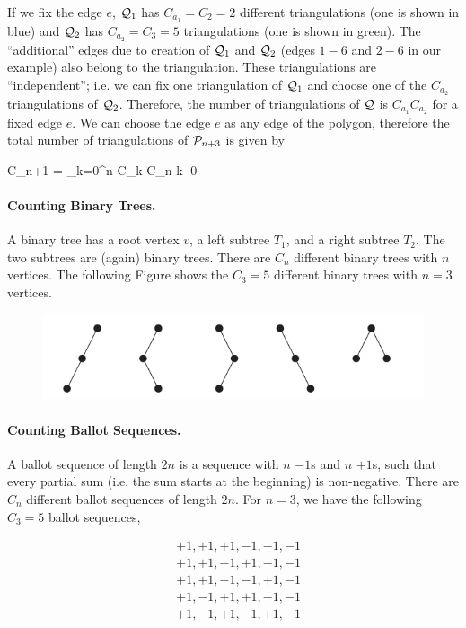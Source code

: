 If we fix the edge $e$, $\mathcal{Q}_1$ has $C_{a_1}= C_2=2$ different triangulations (one is shown in blue) and $\mathcal{Q}_2$ has $C_{a_2}= C_3 = 5$ triangulations (one is shown in green). The ``additional'' edges due to creation of $\mathcal{Q}_1$ and $\mathcal{Q}_2$ (edges $1-6$ and $2-6$ in our example) also belong to the triangulation. These triangulations are ``independent''; i.e. we can fix one triangulation of $\mathcal{Q}_1$ and choose one of the $C_{a_2}$ triangulations of $\mathcal{Q}_2$. Therefore, the number of triangulations of $\mathcal{Q}$ is $C_{a_1} C_{a_2}$ for a fixed edge $e$. We can choose the edge $e$ as any edge of the polygon, therefore the total number of triangulations of $\mathcal{P}_{n+3}$ is given by

\bee
C_{n+1} = \sum_{k=0}^n C_k C_{n-k} \qed
\eee

\paragraph{Counting Binary Trees.} A binary tree has a root vertex $v$, a left subtree $T_1$, and a right subtree $T_2$. The two subtrees are (again) binary trees. There are $C_n$ different binary trees with $n$ vertices. The following Figure shows the $C_3=5$ different binary trees with $n=3$ vertices.

\begin{figure}[H]
\centering
\includegraphics[scale=0.7]{images/2022-06-15-catalan_10.png}
\end{figure}


\paragraph{Counting Ballot Sequences.} A ballot sequence of length $2n$ is a sequence with $n$ $-1$s and $n$ $+1$s, such that every partial sum (i.e. the sum starts at the beginning) is non-negative. There are $C_n$ different ballot sequences of length $2n$. For $n=3$, we have the following $C_3=5$ ballot sequences,

\begin{align*}
  &+1, +1, +1, -1, -1, -1 \\
  &+1, +1, -1, +1, -1, -1 \\
  &+1, +1, -1, -1, +1, -1 \\
  &+1, -1, +1, +1, -1, -1 \\
  &+1, -1, +1, -1, +1, -1
\end{align*}


